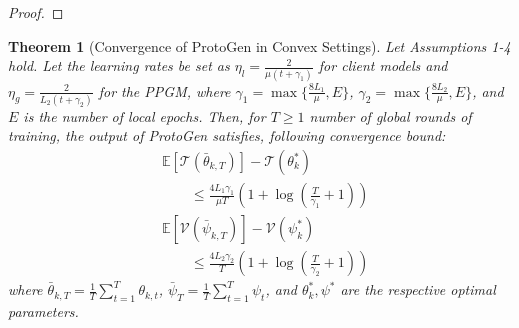 \documentclass[lettersize,journal]{IEEEtran}
\newtheorem{theorem}{Theorem}
\newtheorem{proof}{Proof}
\begin{document}
\begin{proof}




\end{proof}

\begin{theorem}[Convergence of \textsf{ProtoGen} in Convex Settings]
\label{theo:1}
Let Assumptions 1-4 hold. Let the learning rates be set as $\eta_l = \frac{2}{\mu(t+\gamma_1)}$ for client models and $\eta_g = \frac{2}{L_2(t+\gamma_2)}$ for the \emph{PPGM}, where $\gamma_1 = \max\{\frac{8L_1}{\mu}, E\}$, $\gamma_2 = \max\{\frac{8L_2}{\mu}, E\}$, and $E$ is the number of local epochs. Then, for $T \geq 1$ number of global rounds of training, the output of \textsf{ProtoGen} satisfies, following convergence bound:
\begin{equation}
\begin{split}
    &\mathbb{E}[\mathcal{T}(\bar{\theta}_{k,T})] - \mathcal{T}(\theta_k^*)\\ 
    &\qquad \leq \frac{4L_1\gamma_1}{\mu T}\left(1 + \log\left(\frac{T}{\gamma_1} + 1\right)\right)
\end{split}
\end{equation}
\begin{equation}
\begin{split}
    &\mathbb{E}[\mathcal{V}(\bar{\psi}_{k,T})] - \mathcal{V}(\psi_k^*)\\ 
    & \qquad \leq \frac{4L_2\gamma_2}{T}\left(1 + \log\left(\frac{T}{\gamma_2} + 1\right)\right)
\end{split}
\end{equation}
where $\bar{\theta}_{k,T} = \frac{1}{T}\sum_{t=1}^T \theta_{k,t}$, $\bar{\psi}_T = \frac{1}{T}\sum_{t=1}^T \psi_t$, and $\theta_k^*, \psi^*$ are the respective optimal parameters.
\end{theorem}
\end{document}
